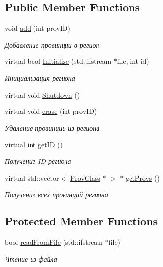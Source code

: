 \subsection*{Public Member Functions}
\begin{DoxyCompactItemize}
\item 
void \hyperlink{class_nation_region_class_ab27cc488b934845a37d02186c6b4894e}{add} (int prov\+ID)
\begin{DoxyCompactList}\small\item\em Добавление провинции в регион \end{DoxyCompactList}\item 
virtual bool \hyperlink{class_prov_region_class_a733b3a8580bd1bb038295a5b8ab4f1a0}{Initialize} (std\+::ifstream $\ast$file, int id)
\begin{DoxyCompactList}\small\item\em Инициализация региона \end{DoxyCompactList}\item 
virtual void \hyperlink{class_prov_region_class_adf3f702c865e613515590fb928a5eaf1}{Shutdown} ()
\item 
virtual void \hyperlink{class_prov_region_class_ad28dbe98716517339922d6c4e0433611}{erase} (int prov\+ID)
\begin{DoxyCompactList}\small\item\em Удаление провинции из региона \end{DoxyCompactList}\item 
virtual int \hyperlink{class_prov_region_class_ab6f83c85a913b7f9ac3f6839b3386793}{get\+ID} ()
\begin{DoxyCompactList}\small\item\em Получение ID региона \end{DoxyCompactList}\item 
virtual std\+::vector$<$ \hyperlink{class_prov_class}{Prov\+Class} $\ast$ $>$ $\ast$ \hyperlink{class_prov_region_class_a31c1bdb93bda5a0bd0fc66382d39473e}{get\+Provs} ()
\begin{DoxyCompactList}\small\item\em Получение всех провинций региона \end{DoxyCompactList}\end{DoxyCompactItemize}
\subsection*{Protected Member Functions}
\begin{DoxyCompactItemize}
\item 
bool \hyperlink{class_prov_region_class_ae6a10139f79ab3a22d28422b433f588b}{read\+From\+File} (std\+::ifstream $\ast$file)
\begin{DoxyCompactList}\small\item\em Чтение из файла \end{DoxyCompactList}\end{DoxyCompactItemize}
